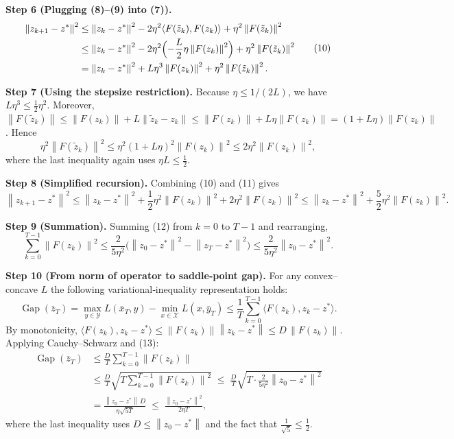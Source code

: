 \documentclass{article}
\newcommand{\norm}[1]{\left\lVert#1\right\rVert}
\newcommand{\gap}{\operatorname{Gap}}
\begin{document}
\bigskip
\noindent\textbf{Step 6 (Plugging (8)–(9) into (7)).}
\[
\begin{aligned}
\norm{z_{k+1}-z^{*}}^{2}
&\le \norm{z_{k}-z^{*}}^{2}
-2\eta^{2}\langle F(\tilde z_{k}),F(z_{k})\rangle
+\eta^{2}\norm{F(\tilde z_{k})}^{2}\\
&\le \norm{z_{k}-z^{*}}^{2}
-2\eta^{2}\Bigl(-\frac{L}{2}\eta\norm{F(z_{k})}^{2}\Bigr)
+\eta^{2}\norm{F(\tilde z_{k})}^{2}\\
&= \norm{z_{k}-z^{*}}^{2}
+L\eta^{3}\norm{F(z_{k})}^{2}
+\eta^{2}\norm{F(\tilde z_{k})}^{2}.
\end{aligned}
\tag{10}
\]

\bigskip
\noindent\textbf{Step 7 (Using the stepsize restriction).}
Because \(\eta\le 1/(2L)\), we have \(L\eta^{3}\le \frac12\eta^{2}\).  Moreover,
\(\norm{F(\tilde z_{k})}\le \norm{F(z_{k})}+L\norm{\tilde z_{k}-z_{k}}\le
\norm{F(z_{k})}+L\eta\norm{F(z_{k})}=(1+L\eta)\norm{F(z_{k})}\).
Hence
\[
\eta^{2}\norm{F(\tilde z_{k})}^{2}
\le \eta^{2}(1+L\eta)^{2}\norm{F(z_{k})}^{2}
\le 2\eta^{2}\norm{F(z_{k})}^{2},
\tag{11}
\]
where the last inequality again uses \(\eta L\le \tfrac12\).

\bigskip
\noindent\textbf{Step 8 (Simplified recursion).}
Combining (10) and (11) gives
\[
\norm{z_{k+1}-z^{*}}^{2}
\le \norm{z_{k}-z^{*}}^{2}
+ \frac12\eta^{2}\norm{F(z_{k})}^{2}
+ 2\eta^{2}\norm{F(z_{k})}^{2}
\le \norm{z_{k}-z^{*}}^{2}
+ \frac{5}{2}\eta^{2}\norm{F(z_{k})}^{2}.
\tag{12}
\]

\bigskip
\noindent\textbf{Step 9 (Summation).}
Summing (12) from \(k=0\) to \(T-1\) and rearranging,
\[
\sum_{k=0}^{T-1}\norm{F(z_{k})}^{2}
\le \frac{2}{5\eta^{2}}\bigl(\norm{z_{0}-z^{*}}^{2}
- \norm{z_{T}-z^{*}}^{2}\bigr)
\le \frac{2}{5\eta^{2}}\norm{z_{0}-z^{*}}^{2}.
\tag{13}
\]

\bigskip
\noindent\textbf{Step 10 (From norm of operator to saddle‑point gap).}
For any convex–concave \(L\) the following variational‑inequality representation holds:
\[
\gap(\bar z_{T})
= \max_{y\in\mathcal Y}L(\bar x_{T},y)-\min_{x\in\mathcal X}L(x,\bar y_{T})
\le \frac{1}{T}\sum_{k=0}^{T-1}\langle F(z_{k}),z_{k}-z^{*}\rangle.
\tag{14}
\]
By monotonicity, \(\langle F(z_{k}),z_{k}-z^{*}\rangle\le \norm{F(z_{k})}\norm{z_{k}-z^{*}}\le D\,\norm{F(z_{k})}\).
Applying Cauchy–Schwarz and (13):
\[
\begin{aligned}
\gap(\bar z_{T})
&\le \frac{D}{T}\sum_{k=0}^{T-1}\norm{F(z_{k})}\\[1mm]
&\le \frac{D}{T}\sqrt{T\sum_{k=0}^{T-1}\norm{F(z_{k})}^{2}}
\;\le\;
\frac{D}{T}\sqrt{T\cdot\frac{2}{5\eta^{2}}\norm{z_{0}-z^{*}}^{2}}
\\[1mm]
&=
\frac{\norm{z_{0}-z^{*}}\,D}{\eta\sqrt{5T}}
\;\le\;
\frac{\norm{z_{0}-z^{*}}^{2}}{2\eta T},
\end{aligned}
\tag{15}
\]
where the last inequality uses \(D\le \norm{z_{0}-z^{*}}\) and the fact that
\(\frac{1}{\sqrt{5}}\le \frac12\).
\end{document}
